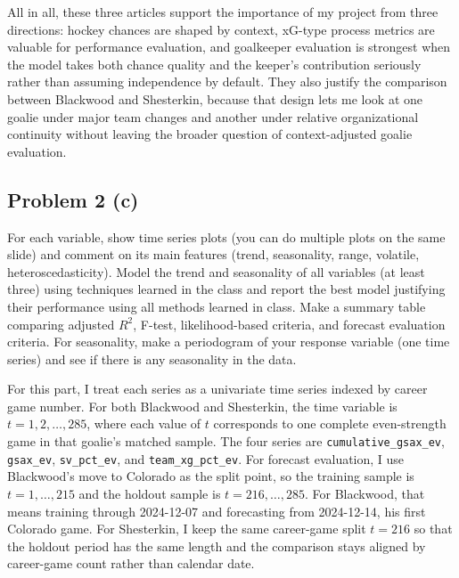 \documentclass[
  10pt,
]{extarticle}
\begin{document}
All in all, these three articles support the importance of my project from three directions: hockey chances are shaped by context, xG-type process metrics are valuable for performance evaluation, and goalkeeper evaluation is strongest when the model takes both chance quality and the keeper's contribution seriously rather than assuming independence by default. They also justify the comparison between Blackwood and Shesterkin, because that design lets me look at one goalie under major team changes and another under relative organizational continuity without leaving the broader question of context-adjusted goalie evaluation.

\newpage

\subsection{Problem 2 (c)}\label{problem-2-c}

\begin{problem}[Problem 2 (c)]
For each variable, show time series plots (you can do multiple plots on the same slide) and comment on its main features (trend, seasonality, range, volatile, heteroscedasticity). Model the trend and seasonality of all variables (at least three) using techniques learned in the class and report the best model justifying their performance using all methods learned in class. Make a summary table comparing adjusted \(R^2\), F-test, likelihood-based criteria, and forecast evaluation criteria. For seasonality, make a periodogram of your response variable (one time series) and see if there is any seasonality in the data.
\end{problem}

For this part, I treat each series as a univariate time series indexed by career game number. For both Blackwood and Shesterkin, the time variable is \(t = 1, 2, \ldots, 285\), where each value of \(t\) corresponds to one complete even-strength game in that goalie's matched sample. The four series are \texttt{cumulative\_gsax\_ev}, \texttt{gsax\_ev}, \texttt{sv\_pct\_ev}, and \texttt{team\_xg\_pct\_ev}. For forecast evaluation, I use Blackwood's move to Colorado as the split point, so the training sample is \(t = 1, \ldots, 215\) and the holdout sample is \(t = 216, \ldots, 285\). For Blackwood, that means training through 2024-12-07 and forecasting from 2024-12-14, his first Colorado game. For Shesterkin, I keep the same career-game split \(t = 216\) so that the holdout period has the same length and the comparison stays aligned by career-game count rather than calendar date.
\end{document}

